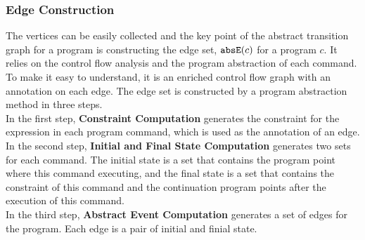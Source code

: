 \subsubsection{Edge Construction}
\label{sec:abscfg-edge}
  The vertices can be easily collected and the key point of the abstract
  transition graph for a program is constructing the edge set, $\mathtt{abs}{\mathtt{E}}(c)$ for a program $c$.
  It relies on the control flow analysis and the program abstraction of each command.
  To make it easy to understand, it
  is an enriched control flow graph with an annotation on each edge.
  The edge set is constructed by a program abstraction method in three steps.
  \\
  In the first step, \textbf{Constraint Computation} generates the constraint
  for the expression in each program command,
  which is used as the annotation of an edge.
  \\
  In the second step, \textbf{Initial and Final State Computation} generates two sets for each command. 
  The initial state is a set that contains the
  program point where this command  executing, 
  and the final state is a set
  that contains the constraint of this command
  and the continuation program points after the execution of this command.
  \\ 
  In the third step, \textbf{Abstract Event Computation} generates a set of edges for the program.
  Each edge is a pair of initial and finial state.
%
